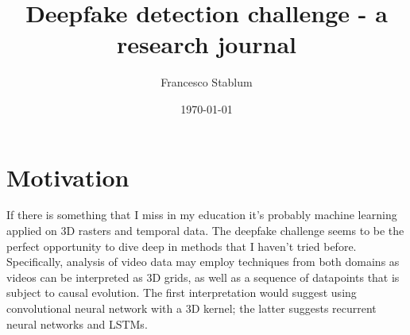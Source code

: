 \documentclass{article}
\title{Deepfake detection challenge - a research journal}
\author{Francesco Stablum}
\date{\today}
\begin{document}
\maketitle

\section{Motivation}

If there is something that I miss in my education it's probably
machine learning applied on 3D rasters and temporal data.
The deepfake challenge seems to be the perfect opportunity
to dive deep in methods that I haven't tried before.
Specifically, analysis of video data may employ techniques from both domains
as videos can be interpreted as 3D grids, as well as a sequence of datapoints that
is subject to causal evolution. The first interpretation would suggest using
convolutional neural network with a 3D kernel; the latter suggests recurrent neural networks
and LSTMs.




{}

\end{document}

